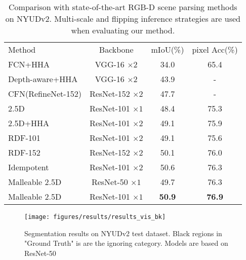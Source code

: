 \documentclass[runningheads]{llncs}
\begin{document}
\begin{table}[htbp]
  \begin{center}
  \caption{Comparison with state-of-the-art RGB-D scene parsing methods on NYUDv2.
  Multi-scale and flipping inference strategies are used when evaluating our method.
}
  \label{table:nyu_sota_compare}
  \setlength{\tabcolsep}{9pt}
  \begin{tabular}{lccc}
    \hline\noalign{\smallskip}
    Method & Backbone & mIoU(\%) & pixel Acc(\%)\\
    \noalign{\smallskip}
    \hline
    \noalign{\smallskip}
    FCN+HHA\cite{FCN_PAMI} & VGG-16 $\times2$ & 34.0 & 65.4 \\
Depth-aware+HHA\cite{DepthAware} & VGG-16 $\times2$ & 43.9 & - \\
CFN(RefineNet-152)\cite{CFN} & ResNet-152 $\times2$ & 47.7 & -\\
2.5D\cite{2_5D} & ResNet-101 $\times1$ & 48.4  & 75.3 \\
    2.5D+HHA\cite{2_5D} & ResNet-101 $\times2$ & 49.1  & 75.9 \\
    RDF-101\cite{RDFNet} & ResNet-101 $\times2$ & 49.1 & 75.6\\
    RDF-152\cite{RDFNet} & ResNet-152 $\times2$ & 50.1 & 76.0 \\
    Idempotent\cite{Coupling} & ResNet-101 $\times2$ & 50.6 & 76.3 \\
    \noalign{\smallskip}
    \hline
    \noalign{\smallskip}
    Malleable 2.5D   & ResNet-50 $\times1$ & 49.7 & 76.3 \\
    Malleable 2.5D  & ResNet-101 $\times1$ & \textbf{50.9} & \textbf{76.9} \\
    \hline
  \end{tabular}
  \end{center}
\end{table}

\begin{figure}[tbp]
  \centering
  \texttt{[image: figures/results/results\_vis\_bk]}
  \caption{
  Segmentation results on NYUDv2 test dataset.
  Black regions in "Ground Truth" is are the ignoring category.
  Models are based on ResNet-50
  }
  \label{fig:results_vis}
\end{figure}
\end{document}
